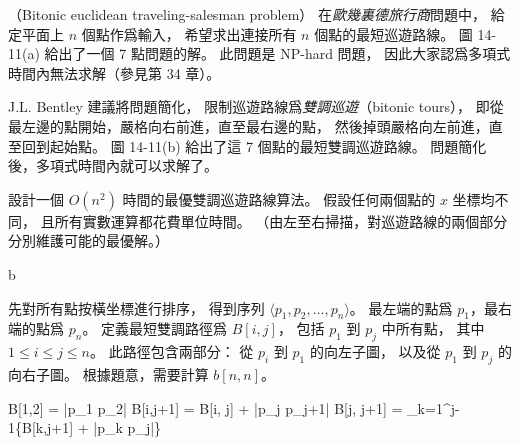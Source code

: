 \startPROBLEM[problem:14-3]
（Bitonic euclidean traveling-salesman problem）
在\emph{歐幾裏德旅行商}問題中，
給定平面上 $n$ 個點作爲輸入，
希望求出連接所有 $n$ 個點的最短巡遊路線。
圖 14-11(a) 給出了一個 7 點問題的解。
此問題是 NP-hard 問題，
因此大家認爲多項式時間內無法求解（參見第 34 章）。

J.L. Bentley 建議將問題簡化，
限制巡遊路線爲\emph{雙調巡遊}（bitonic tours），
即從最左邊的點開始，嚴格向右前進，直至最右邊的點，
然後掉頭嚴格向左前進，直至回到起始點。
圖 14-11(b) 給出了這 7 個點的最短雙調巡遊路線。
問題簡化後，多項式時間內就可以求解了。

設計一個 $O(n^2)$ 時間的最優雙調巡遊路線算法。
假設任何兩個點的 $x$ 坐標均不同，
且所有實數運算都花費單位時間。
（\hint 由左至右掃描，對巡遊路線的兩個部分分別維護可能的最優解。）
\stopPROBLEM

\startANSWER
{}
{\externalfigure[p14_3-2][width=.3\textwidth]}{b}
\stopcombination

先對所有點按橫坐標進行排序，
得到序列 $\langle p_1, p_2, \ldots, p_n\rangle$。
最左端的點爲 $p_1$，最右端的點爲 $p_n$。
定義最短雙調路徑爲 $B[i,j]$，
包括 $p_1$ 到 $p_j$ 中所有點，
其中 $1\le i \le j\le n$。
此路徑包含兩部分：
從 $p_i$ 到 $p_1$ 的向左子圖，
以及從 $p_1$ 到 $p_j$ 的向右子圖。
根據題意，需要計算 $b[n,n]$。

\startformula\startmathalignment
\NC B[1,2] \NC = |p_1 p_2| \NR
\NC B[i,j+1] \NC = B[i, j] + |p_{j} p_{j+1}| \qquad {} \NR
\NC B[j, j+1] \NC = \min_{k=1}^{j-1}\{B[k,j+1] + |p_k p_{j}|\} \NR
\stopmathalignment\stopformula
\stopANSWER
